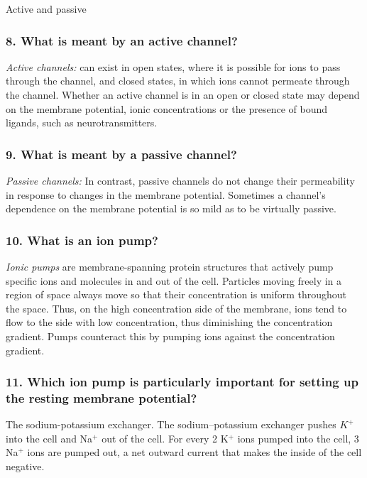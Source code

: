 Active and passive

\subsubsection{8. What is meant by an active channel?}

\textit{Active channels:} can exist in open states, where it is possible for ions to pass through the channel, and closed states, in which ions cannot permeate through the channel. Whether an active channel is in an open or closed state may depend on the membrane potential, ionic concentrations or the presence of bound ligands, such as neurotransmitters.

\subsubsection{9. What is meant by a passive channel?}

\textit{Passive channels:} In contrast, passive channels do not change their permeability in response to changes in the membrane potential. Sometimes a channel’s dependence on the membrane potential is so mild as to be virtually passive.

\subsubsection{10. What is an ion pump?}

\textit{Ionic pumps} are membrane-spanning protein structures that actively pump specific ions and molecules in and out of the cell. Particles moving freely in a region of space always move so that their concentration is uniform throughout the space. Thus, on the high concentration side of the membrane, ions tend to flow to the side with low concentration, thus diminishing the concentration gradient. Pumps counteract this by pumping ions against the concentration gradient.

\subsubsection{11. Which ion pump is particularly important for setting up the resting membrane potential?}

The sodium-potassium exchanger. The sodium–potassium exchanger pushes $K^+$ into the cell and Na$^+$ out of the cell. For every 2 K$^+$ ions pumped into the cell, 3 Na$^+$ ions are pumped out, a net outward current that makes the inside of the cell negative.

